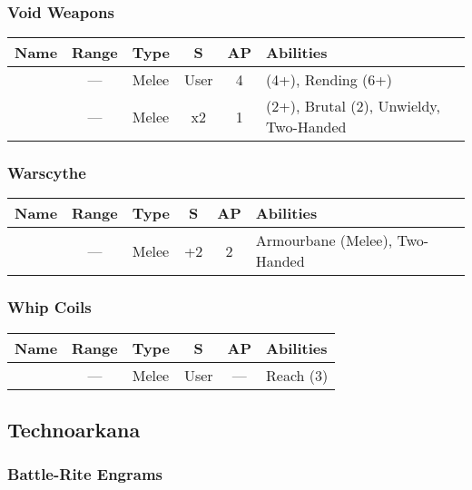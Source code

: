 \subsubsection{Void Weapons}

\label{Voidblade} \label{Voidscythe}
\noindent
\begin{NiceTabular}{L{115 pt} c C{40pt} *{2}{c} >{\raggedright\arraybackslash}p{240pt}}
	Name & Range & Type & S & AP & Abilities \\
	\hline
	 & — & Melee & User & 4 &  (4+), Rending (6+) \\
	  & — & Melee & x2 & 1 &  (2+), Brutal (2), Unwieldy, Two-Handed \\
\end{NiceTabular}

\subsubsection{Warscythe}
\label{Warscythe}
\noindent
\begin{NiceTabular}{L{115 pt} c C{40pt} *{2}{c} >{\raggedright\arraybackslash}p{240pt}}
	Name & Range & Type & S & AP & Abilities \\
	\hline
	 & — & Melee & +2 & 2 & Armourbane (Melee), Two-Handed \\
\end{NiceTabular}

\subsubsection{Whip Coils}
\label{Whip Coils}
\noindent
\begin{NiceTabular}{L{115 pt} c C{40pt} *{2}{c} >{\raggedright\arraybackslash}p{240pt}}
	Name & Range & Type & S & AP & Abilities \\
	\hline
	 & — & Melee & User & — & Reach (3) \\
\end{NiceTabular}



\subsection{Technoarkana} \label{Technoarcana}


\subsubsection{Battle-Rite Engrams} \label{Battle-Rite Engrams}

